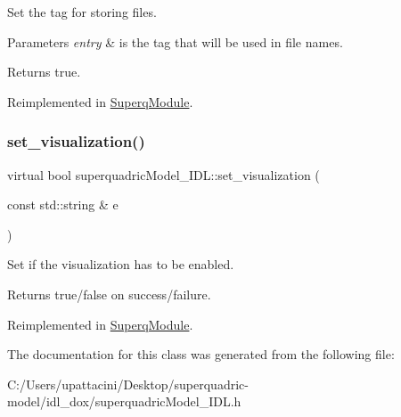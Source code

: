 Set the tag for storing files. 


\begin{DoxyParams}{Parameters}
{\em entry} & is the tag that will be used in file names. \\
\hline
\end{DoxyParams}
\begin{DoxyReturn}{Returns}
true. 
\end{DoxyReturn}


Reimplemented in \mbox{\hyperlink{classSuperqModule_ae9f0cfead2c367e4c3aa25292b5c42c6}{Superq\+Module}}.

\mbox{\label{classsuperquadricModel__IDL_a651c741e9b01b25d46be96b06b91011d}} 
\subsubsection{\texorpdfstring{set\+\_\+visualization()}{set\_visualization()}}
{\footnotesize\ttfamily virtual bool superquadric\+Model\+\_\+\+I\+D\+L\+::set\+\_\+visualization (\begin{DoxyParamCaption}\item[{const std\+::string \&}]{e }\end{DoxyParamCaption})\hspace{0.3cm}{\ttfamily [virtual]}}



Set if the visualization has to be enabled. 

\begin{DoxyReturn}{Returns}
true/false on success/failure. 
\end{DoxyReturn}


Reimplemented in \mbox{\hyperlink{classSuperqModule_ae4fc54ad89b3ee72ab5ea8c8b5065866}{Superq\+Module}}.



The documentation for this class was generated from the following file\+:\begin{DoxyCompactItemize}
\item 
C\+:/\+Users/upattacini/\+Desktop/superquadric-\/model/idl\+\_\+dox/superquadric\+Model\+\_\+\+I\+D\+L.\+h\end{DoxyCompactItemize}
